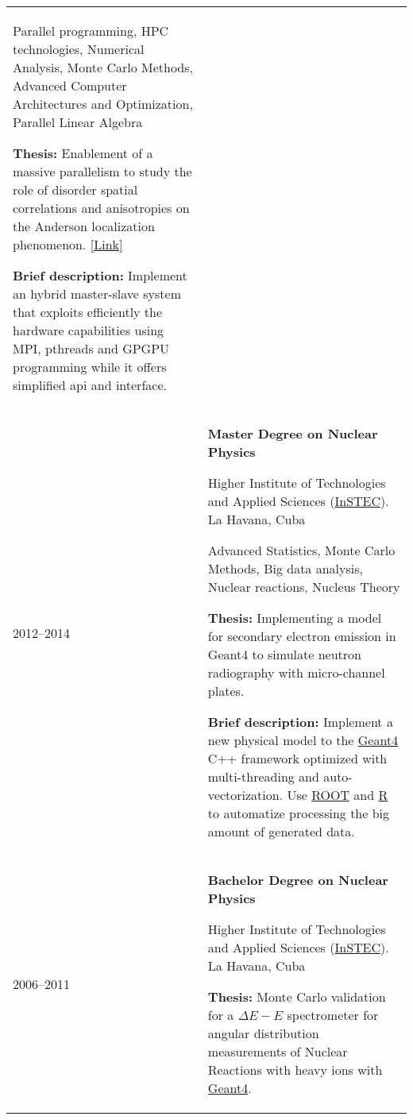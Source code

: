 \documentclass[a4paper,10pt]{article}
\begin{document}
\begin{tabularx}{\linewidth}{@{}l X@{}}
               Parallel programming, HPC technologies, Numerical Analysis, Monte
               Carlo Methods, Advanced Computer Architectures and Optimization,
               Parallel Linear Algebra

               \textbf{Thesis:} Enablement of a massive parallelism to study the role of disorder
               spatial correlations and anisotropies on the Anderson localization phenomenon.
               \href{https://backend.mhpc.sissa.it/sites/default/files/2021-02/JimmyAguilarMena.pdf}{[Link]}

               \textbf{Brief description:} Implement an hybrid master-slave system that exploits efficiently
               the hardware capabilities using MPI, pthreads and GPGPU programming while it offers
               simplified api and interface.
  \\

  2012--2014 & \textbf{Master Degree on Nuclear Physics}

               Higher Institute of Technologies and Applied Sciences (\href{www.instec.cu}{InSTEC}).
               La Havana, Cuba

               Advanced Statistics, Monte Carlo Methods, Big data analysis, Nuclear reactions, Nucleus Theory

               \textbf{Thesis:} Implementing a model for secondary electron emission in Geant4 to
               simulate neutron radiography with micro-channel plates.

               \textbf{Brief description:} Implement a new physical model to the
               \href{https://geant4.web.cern.ch/}{Geant4} C++ framework optimized with multi-threading
               and auto-vectorization. Use \href{https://root.cern/}{ROOT} and
               \href{https://www.r-project.org/}{R} to automatize processing the big amount of
               generated data.
  \\

  2006--2011 & \textbf{Bachelor Degree on Nuclear Physics}

               Higher Institute of Technologies and Applied Sciences (\href{www.instec.cu}{InSTEC}).
               La Havana, Cuba

               \textbf{Thesis:} Monte Carlo validation for a $\Delta E-E$ spectrometer for angular
               distribution measurements of Nuclear Reactions with heavy ions with
               \href{https://geant4.web.cern.ch/}{Geant4}.
  \\
\end{tabularx}
\end{document}
